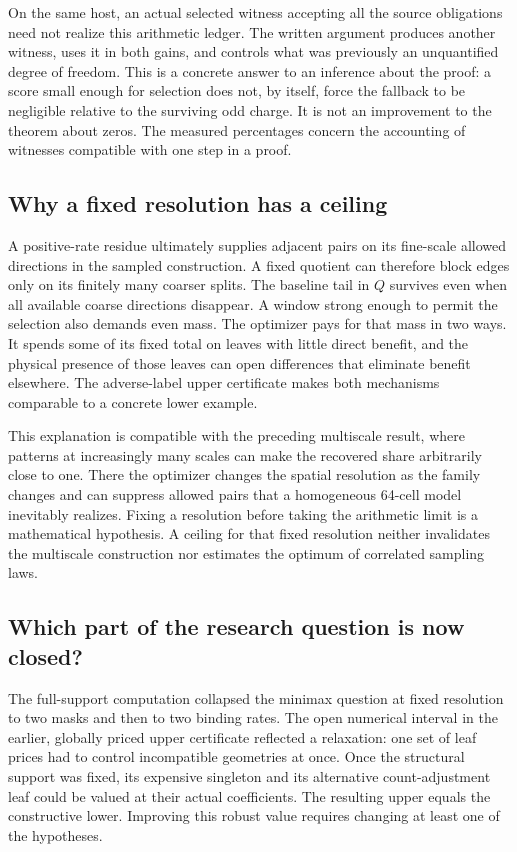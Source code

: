 \documentclass[12pt,letterpaper]{article}
\begin{document}
On the same host, an actual selected witness accepting all the source obligations need not realize this arithmetic ledger. The written argument produces another witness, uses it in both gains, and controls what was previously an unquantified degree of freedom. This is a concrete answer to an inference about the proof: a score small enough for selection does not, by itself, force the fallback to be negligible relative to the surviving odd charge. It is not an improvement to the theorem about zeros. The measured percentages concern the accounting of witnesses compatible with one step in a proof.

\subsection{Why a fixed resolution has a ceiling}
A positive-rate residue ultimately supplies adjacent pairs on its fine-scale allowed directions in the sampled construction. A fixed quotient can therefore block edges only on its finitely many coarser splits. The baseline tail in \(Q\) survives even when all available coarse directions disappear. A window strong enough to permit the selection also demands even mass. The optimizer pays for that mass in two ways. It spends some of its fixed total on leaves with little direct benefit, and the physical presence of those leaves can open differences that eliminate benefit elsewhere. The adverse-label upper certificate makes both mechanisms comparable to a concrete lower example.

This explanation is compatible with the preceding multiscale result, where patterns at increasingly many scales can make the recovered share arbitrarily close to one. There the optimizer changes the spatial resolution as the family changes and can suppress allowed pairs that a homogeneous 64-cell model inevitably realizes. Fixing a resolution before taking the arithmetic limit is a mathematical hypothesis. A ceiling for that fixed resolution neither invalidates the multiscale construction nor estimates the optimum of correlated sampling laws.

\subsection{Which part of the research question is now closed?}
The full-support computation collapsed the minimax question at fixed resolution to two masks and then to two binding rates. The open numerical interval in the earlier, globally priced upper certificate reflected a relaxation: one set of leaf prices had to control incompatible geometries at once. Once the structural support was fixed, its expensive singleton and its alternative count-adjustment leaf could be valued at their actual coefficients. The resulting upper equals the constructive lower. Improving this robust value requires changing at least one of the hypotheses.
\end{document}
